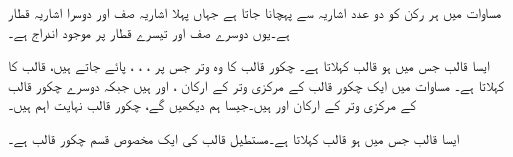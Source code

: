مساوات  میں ہر رکن کو دو عدد اشاریہ سے پہچانا جاتا ہے جہاں پہلا اشاریہ صف اور دوسرا اشاریہ قطار ہے۔یوں  دوسرے صف اور تیسرے قطار پر موجود اندراج ہے۔

ایسا قالب جس میں  ہو   قالب کہلاتا ہے۔ چکور قالب کا وہ وتر جس پر ، ، ،  پائے جاتے ہیں، قالب کا  کہلاتا ہے۔ مساوات  میں ایک چکور قالب کے مرکزی وتر کے ارکان ،  اور  ہیں جبکہ دوسرے چکور قالب کے مرکزی وتر کے ارکان  اور  ہیں۔جیسا ہم دیکھیں گے، چکور قالب نہایت اہم ہیں۔

ایسا قالب جس میں  ہو   قالب کہلاتا ہے۔مستطیل قالب کی ایک مخصوص قسم چکور قالب ہے۔


